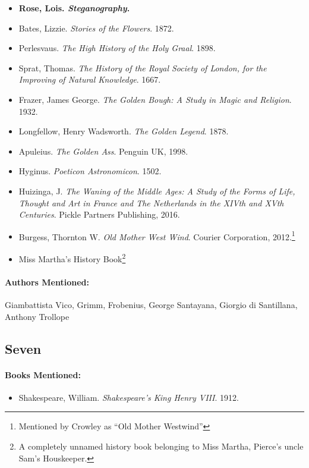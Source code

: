 \documentclass[12pt]{article}
\providecommand{\tightlist}{%
  \setlength{\itemsep}{0pt}\setlength{\parskip}{0pt}}
\begin{document}
\begin{itemize}
\tightlist
\item
  \textbf{Rose, Lois. \emph{Steganography}.}
\item
  Bates, Lizzie. \emph{Stories of the Flowers}. 1872.
\item
  Perlesvaus. \emph{The High History of the Holy Graal}. 1898.
\item
  Sprat, Thomas. \emph{The History of the Royal Society of London, for the Improving of Natural Knowledge}. 1667.
\item
  Frazer, James George. \emph{The Golden Bough: A Study in Magic and Religion}. 1932.
\item
  Longfellow, Henry Wadsworth. \emph{The Golden Legend}. 1878.
\item
  Apuleius. \emph{The Golden Ass}. Penguin UK, 1998.
\item
  Hyginus. \emph{Poeticon Astronomicon}. 1502.
\item
  Huizinga, J. \emph{The Waning of the Middle Ages: A Study of the Forms of Life, Thought and Art in France and The Netherlands in the XIVth and XVth Centuries}. Pickle Partners Publishing, 2016.
\item
  Burgess, Thornton W. \emph{Old Mother West Wind}. Courier Corporation, 2012.\footnote{Mentioned by Crowley as ``Old Mother Westwind''}
\item
  Miss Martha's History Book\footnote{A completely unnamed history book belonging to Miss Martha, Pierce's uncle Sam's Houskeeper.}
\end{itemize}

\paragraph{Authors Mentioned:}\label{authors-mentioned-4}

Giambattista Vico, Grimm, Frobenius, George Santayana, Giorgio di Santillana, Anthony Trollope

\subsection{Seven}\label{seven}

\paragraph{Books Mentioned:}\label{books-mentioned-8}

\begin{itemize}
\tightlist
\item
  Shakespeare, William. \emph{Shakespeare's King Henry VIII}. 1912.
\end{itemize}
\end{document}
